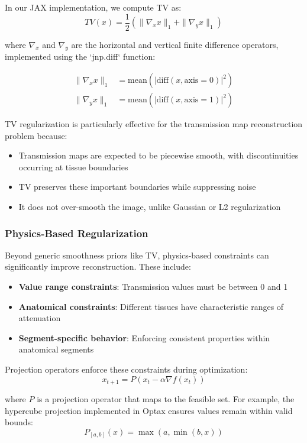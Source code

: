 \documentclass[nomenclature, english, bibtex]{kththesis}
\numberwithin{listing}{chapter}
\begin{document}
In our JAX implementation, we compute TV as:
\begin{equation}
TV(x) = \frac{1}{2}\left(\|\nabla_x x\|_1 + \|\nabla_y x\|_1\right)
\end{equation}

where $\nabla_x$ and $\nabla_y$ are the horizontal and vertical finite difference operators, implemented using the `jnp.diff` function:

\begin{align}
\|\nabla_x x\|_1 &= \text{mean}(|\text{diff}(x, \text{axis}=0)|^2) \\
\|\nabla_y x\|_1 &= \text{mean}(|\text{diff}(x, \text{axis}=1)|^2)
\end{align}

TV regularization is particularly effective for the transmission map reconstruction problem because:
\begin{itemize}
    \item Transmission maps are expected to be piecewise smooth, with discontinuities occurring at tissue boundaries
    \item TV preserves these important boundaries while suppressing noise
    \item It does not over-smooth the image, unlike Gaussian or L2 regularization
\end{itemize}

\subsubsection{Physics-Based Regularization}
Beyond generic smoothness priors like TV, physics-based constraints can significantly improve reconstruction. These include:
\begin{itemize}
    \item \textbf{Value range constraints}: Transmission values must be between 0 and 1
    \item \textbf{Anatomical constraints}: Different tissues have characteristic ranges of attenuation
    \item \textbf{Segment-specific behavior}: Enforcing consistent properties within anatomical segments
\end{itemize}

Projection operators enforce these constraints during optimization:
\begin{equation}
x_{t+1} = P(x_t - \alpha \nabla f(x_t))
\end{equation}

where $P$ is a projection operator that maps to the feasible set. For example, the hypercube projection implemented in Optax \cite{optax2020github} ensures values remain within valid bounds:
\begin{equation}
P_{[a,b]}(x) = \max(a, \min(b, x))
\end{equation}
\end{document}
